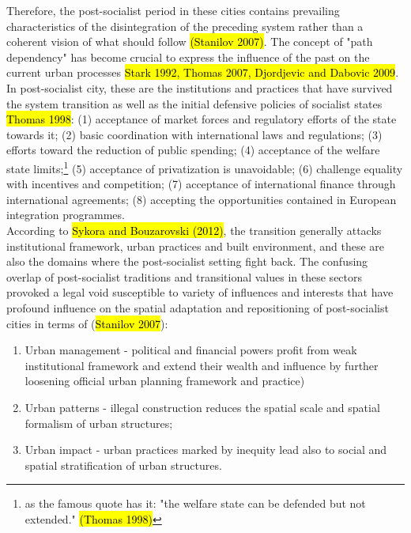 \documentclass[11pt]{report}
\begin{document}
Therefore,  the  post-socialist period in these cities contains prevailing characteristics of the disintegration of the preceding system rather than a coherent vision of what should follow \hl{(Stanilov 2007)}. 
The concept of "path dependency" has become crucial to express the influence of the past on the current urban processes \hl{Stark 1992, Thomas 2007, Djordjevic and Dabovic 2009}.
In post-socialist city, these are the institutions and practices that have survived the system transition as well as the initial defensive policies of socialist states \hl{Thomas 1998}: 
(1) acceptance of market  forces and regulatory efforts of the state towards it;
(2) basic coordination with international laws and regulations;
(3) efforts toward the reduction of public spending;
(4) acceptance of the welfare state limits;\footnote{as the famous quote has it: "the welfare  state can be defended  but  not  extended." \hl{(Thomas 1998)}}
(5) acceptance of  privatization  is  unavoidable;
(6) challenge equality with incentives and competition;
(7) acceptance of international finance through international agreements;
(8) accepting the opportunities contained in European  integration programmes.
\\
According to \hl{Sykora and Bouzarovski (2012)}, the transition generally attacks institutional framework, urban practices and built environment, and these are also the domains where the post-socialist setting fight back.
The confusing overlap of post-socialist traditions and transitional values in these sectors provoked a legal void susceptible to variety of influences and interests that have profound influence on the spatial adaptation and repositioning of post-socialist cities in terms of (\hl{Stanilov 2007}): 
\begin{enumerate}
\item Urban management - political and financial powers profit from weak institutional framework and extend their wealth and influence by further loosening official urban planning framework and practice) 
\item Urban patterns - illegal construction reduces the spatial scale and spatial formalism of urban structures; 
\item Urban impact - urban practices marked by inequity lead also to social and spatial stratification of urban structures.
\end{enumerate}
 
\end{document}
